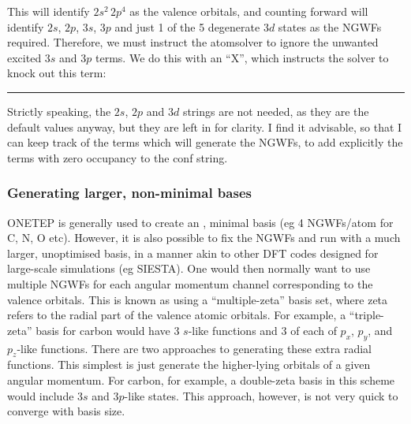 \documentclass[letterpaper,10pt,english]{sphinxmanual}
\begin{document}

This will identify \(2s^{2}\,2p^{4}\) as the valence orbitals, and
counting forward will identify \(2s\), \(2p\), \(3s\),
\(3p\) and just 1 of the 5 degenerate \(3d\) states as the NGWFs
required. Therefore, we must instruct the atomsolver to ignore the
unwanted excited \(3s\) and \(3p\) terms. We do this with an
“X”, which instructs the solver to knock out this term:


\bigskip\hrule\bigskip





Strictly speaking, the \(2s\), \(2p\) and \(3d\) strings are
not needed, as they are the default values anyway, but they are left in
for clarity. I find it advisable, so that I can keep track of the terms
which will generate the NGWFs, to add explicitly the terms with zero
occupancy to the conf string.


\subsubsection{Generating larger, non-minimal bases}
\label{\detokenize{pseudoatomic_solver:generating-larger-non-minimal-bases}}
ONETEP is generally used to create an , minimal basis
(eg 4 NGWFs/atom for C, N, O etc). However, it is also possible to fix
the NGWFs and run with a much larger, unoptimised basis, in a manner
akin to other DFT codes designed for large-scale simulations (eg
SIESTA). One would then normally want to use multiple NGWFs for each
angular momentum channel corresponding to the valence orbitals. This is
known as using a “multiple-zeta” basis set, where zeta refers to the
radial part of the valence atomic orbitals. For example, a “triple-zeta”
basis for carbon would have \(3\) \(s\)-like functions and
\(3\) of each of \(p_{x}\), \(p_{y}\), and
\(p_{z}\)-like functions. There are two approaches to generating
these extra radial functions. This simplest is just generate the
higher-lying orbitals of a given angular momentum. For carbon, for
example, a double-zeta basis in this scheme would include \(3s\) and
\(3p\)-like states. This approach, however, is not very quick to
converge with basis size.
\end{document}
